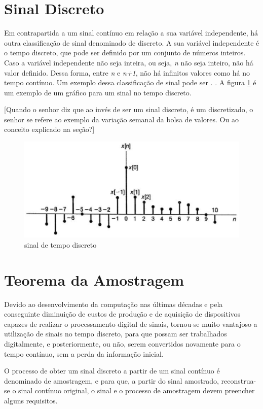 \section{Sinal Discreto}
Em contrapartida a um sinal contínuo em relação a sua variável independente, há outra classificação de sinal denominado de discreto. A sua variável independente é o tempo discreto, que pode ser definido por um conjunto de números inteiros. Caso a variável independente não seja inteira, ou seja, \textit{n} não seja inteiro, não há  valor definido. Dessa forma, entre \textit{n} e \textit{n+1}, não há infinitos valores como há no tempo contínuo. Um exemplo dessa classificação de sinal pode ser . \cite{oppenheim2010sinais}. A figura \ref{fig02} é um exemplo de um gráfico para um sinal no tempo discreto. 

[Quando o senhor diz que ao invés de ser um sinal discreto, é um discretizado, o senhor se refere ao exemplo da variação semanal da bolsa de valores. Ou ao conceito explicado na seção?]


\begin{figure}[h]
	\centering
    \includegraphics[scale=0.5]{figuras/fig02.eps}
	\caption{sinal de tempo discreto}
	\label{fig02}
\end{figure}

\section{Teorema da Amostragem}
Devido ao desenvolvimento da computação nas últimas décadas e pela conseguinte diminuição de custos de produção e de aquisição de dispositivos capazes de realizar o processamento digital de sinais, tornou-se muito vantajoso a utilização de sinais no tempo discreto, para que possam ser trabalhados digitalmente, e posteriormente, ou não, serem convertidos novamente para o tempo contínuo, sem a perda da informação inicial. 

O processo de obter um sinal discreto a partir de um sinal contínuo é denominado de amostragem, e para que, a partir do sinal amostrado, reconstrua-se o sinal contínuo original, o sinal e o processo de amostragem devem preencher alguns requisitos.


